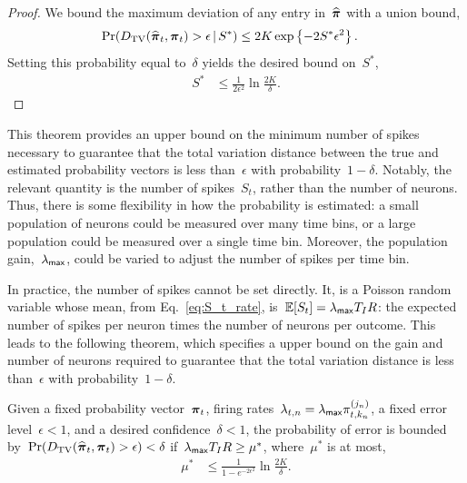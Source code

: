 \begin{proof}
We bound the maximum deviation of any entry in~$\widehat{\boldsymbol{\pi}}$ with a union bound,
\begin{align}
  \Pr({D_{\mathrm{TV}}}(\widehat{\boldsymbol{\pi}}_t, \boldsymbol{\pi}_t) > \epsilon \,|\, S^*) 
  & \leq 2K \exp \left\{-2S^* \epsilon^2 \right\}.
\end{align}
Setting this probability equal to~$\delta$ yields the desired bound on~$S^*$,
\begin{align}
  S^* &\leq \frac{1}{2\epsilon^2} \ln \frac{2K}{\delta}.
\end{align}

\end{proof}


This theorem provides an upper bound on the minimum number of spikes necessary to 
guarantee that the total variation distance between the true and estimated 
probability vectors is less than~$\epsilon$ with probability~$1-\delta$. 
Notably, the relevant quantity is the number of spikes~$S_t$, rather than 
the number of neurons. Thus, there is some flexibility in how the probability 
is estimated: a small population of neurons could be measured over many time bins,
or a large population could be measured over a single time bin. Moreover, the 
population gain,~$\lambda_{\mathsf{max}}$, could be varied to adjust the number of spikes 
per time bin. 

In practice, the number of spikes cannot be set directly. It, is a
Poisson random variable whose mean, from Eq.~\ref{eq:S_t_rate},
is~$\mathbb{E}[S_t] = \lambda_{\mathsf{max}} T_I R$: the expected number of spikes per neuron times the number of neurons per
outcome. This leads to the following theorem, which specifies a upper bound 
on the gain and number of neurons required to guarantee that the 
total variation distance is less than~$\epsilon$ with probability~$1-\delta$.

\begin{theorem}
  \label{thm:rate_bounds}
  Given a fixed probability vector~$\boldsymbol{\pi}_t$, firing
  rates~$\lambda_{t,n} = \lambda_{\mathsf{max}} \pi_{t,k_n}^{(j_n)}$, a fixed error
  level~$\epsilon < 1$, and a desired confidence~$\delta < 1$, the
  probability of error is bounded
  by~$\Pr({D_{\mathrm{TV}}}(\widehat{\boldsymbol{\pi}}_t, \boldsymbol{\pi}_t) > \epsilon) < \delta$
  if~$\lambda_{\mathsf{max}} T_I R \geq \mu^*$, where~$\mu^*$ is at most,
  \begin{align}
    \mu^* &\leq \frac{1}{1-e^{-2\epsilon^2}} \ln \frac{2K}{\delta}.  
  \end{align}
\end{theorem}

